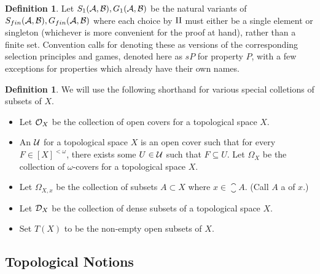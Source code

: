 \documentclass{amsart}
\theoremstyle{plain}
\theoremstyle{definition}
\newtheorem{definition}[theorem]{Definition}
\theoremstyle{remark}
\theoremstyle{plain}
\theoremstyle{definition}
\theoremstyle{remark}
\begin{document}
\begin{definition}
 Let \(S_{1}(\mathcal{A},\mathcal{B}),G_{1}(\mathcal{A},\mathcal{B})\) be the natural variants of \(S_{fin}(\mathcal{A},\mathcal{B}),G_{fin}(\mathcal{A},\mathcal{B})\) where each choice by \(\mathrm{II}\) must either be a single element or singleton (whichever is more convenient for the proof at hand), rather than a finite set.
 Convention calls for denoting these as  versions of the corresponding selection principles and games, denoted here as \(sP\) for property \(P\), with a few exceptions for properties which already have their own names.
\end{definition}

\begin{definition}
 We will use the following shorthand for various special colletions of subsets of \(X\).
  \begin{itemize}
   \item Let \(\mathcal{O}_X\) be the collection of open covers for a topological space   \(X\).
   \item An  \(\mathcal{U}\)   for a topological space \(X\) is an open cover   such that for every \(F\in[X]^{<\omega}\), there exists some \(U\in\mathcal{U}\)   such that \(F\subseteq U\). Let \(\Omega_X\) be the collection of \(\omega\)-covers for a topological   space \(X\).
   \item Let \(\Omega_{X,x}\) be the collection of subsets \(A\subset X\) where   \(x\in\closure{A}\). (Call \(A\) a  of \(x\).)
   \item Let \(\mathcal{D}_{X}\) be the collection of dense subsets of a topological   space \(X\).
   \item Set \(T(X)\) to be the non-empty open subsets of \(X\).
  \end{itemize}
\end{definition}

\subsection{Topological Notions}
\end{document}
